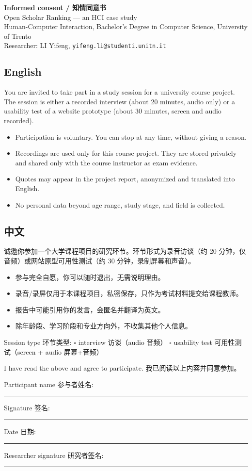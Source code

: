 \documentclass[11pt,a4paper]{article}
\begin{document}
\begin{center}
{\Large\bfseries Informed consent / 知情同意书}\\[4pt]
Open Scholar Ranking — an HCI case study\\
Human-Computer Interaction, Bachelor's Degree in Computer Science, University of Trento\\
Researcher: LI Yifeng, \texttt{yifeng.li@studenti.unitn.it}
\end{center}

\vspace{6pt}
\subsection*{English}
You are invited to take part in a study session for a university course project. The session is either a recorded interview (about 20 minutes, audio only) or a usability test of a website prototype (about 30 minutes, screen and audio recorded).
\begin{itemize}
\item Participation is voluntary. You can stop at any time, without giving a reason.
\item Recordings are used only for this course project. They are stored privately and shared only with the course instructor as exam evidence.
\item Quotes may appear in the project report, anonymized and translated into English.
\item No personal data beyond age range, study stage, and field is collected.
\end{itemize}

\subsection*{中文}
诚邀你参加一个大学课程项目的研究环节。环节形式为录音访谈（约 20 分钟，仅音频）或网站原型可用性测试（约 30 分钟，录制屏幕和声音）。
\begin{itemize}
\item 参与完全自愿，你可以随时退出，无需说明理由。
\item 录音/录屏仅用于本课程项目，私密保存，只作为考试材料提交给课程教师。
\item 报告中可能引用你的发言，会匿名并翻译为英文。
\item 除年龄段、学习阶段和专业方向外，不收集其他个人信息。
\end{itemize}

\vspace{8pt}
Session type 环节类型: $\square$ interview 访谈（audio 音频） \quad $\square$ usability test 可用性测试（screen + audio 屏幕+音频）

\vspace{10pt}
I have read the above and agree to participate. 我已阅读以上内容并同意参加。

\vspace{16pt}
\noindent Participant name 参与者姓名: \rule{5cm}{0.4pt}

\vspace{12pt}
\noindent Signature 签名: \rule{4cm}{0.4pt} \quad Date 日期: \rule{3cm}{0.4pt}

\vspace{12pt}
\noindent Researcher signature 研究者签名: \rule{4cm}{0.4pt}
\end{document}
